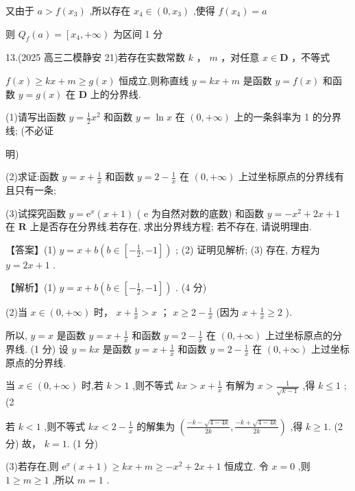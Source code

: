 \documentclass[10pt]{article}
\begin{document}
又由于 \(a > f\left( {x}_{3}\right)\) ,所以存在 \({x}_{4} \in  \left( {0,{x}_{3}}\right)\) ,使得 \(f\left( {x}_{4}\right)  = a\)

则 \({Q}_{f}\left( a\right)  = \left\lbrack  {{x}_{4}, + \infty }\right)\) 为区间 1 分

13.(2025 高三二模静安 21)若存在实数常数 \(k\) ， \(m\) ，对任意 \(x \in  \mathbf{D}\) ，不等式

\(f\left( x\right)  \geq  {kx} + m \geq  g\left( x\right)\) 恒成立,则称直线 \(y = {kx} + m\) 是函数 \(y = f\left( x\right)\) 和函数 \(y = g\left( x\right)\) 在 \(\mathbf{D}\) 上的分界线.

(1)请写出函数 \(y = \frac{1}{2}{x}^{2}\) 和函数 \(y = \ln x\) 在 \(\left( {0, + \infty }\right)\) 上的一条斜率为 1 的分界线; (不必证

明)

(2)求证:函数 \(y = x + \frac{1}{x}\) 和函数 \(y = 2 - \frac{1}{x}\) 在 \(\left( {0, + \infty }\right)\) 上过坐标原点的分界线有且只有一条;

(3)试探究函数 \(y = {\mathrm{e}}^{x}\left( {x + 1}\right)\) ( \(\mathrm{e}\) 为自然对数的底数) 和函数 \(y =  - {x}^{2} + {2x} + 1\) 在 \(\mathbf{R}\) 上是否存在分界线.若存在, 求出分界线方程; 若不存在, 请说明理由.

【答案】(1) \(y = x + b\left( {b \in  \left\lbrack  {-\frac{1}{2}, - 1}\right\rbrack  }\right)\) ; (2) 证明见解析; (3) 存在, 方程为 \(y = {2x} + 1\) .

【解析】(1) \(y = x + b\left( {b \in  \left\lbrack  {-\frac{1}{2}, - 1}\right\rbrack  }\right)\) . (4 分)

(2)当 \(x \in  \left( {0, + \infty }\right)\) 时， \(x + \frac{1}{x} > x\) ； \(x \geq  2 - \frac{1}{x}\) (因为 \(x + \frac{1}{x} \geq  2\) ).

所以, \(y = x\) 是函数 \(y = x + \frac{1}{x}\) 和函数 \(y = 2 - \frac{1}{x}\) 在 \(\left( {0, + \infty }\right)\) 上过坐标原点的分界线. (1 分) 设 \(y = {kx}\) 是函数 \(y = x + \frac{1}{x}\) 和函数 \(y = 2 - \frac{1}{x}\) 在 \(\left( {0, + \infty }\right)\) 上过坐标原点的分界线.

当 \(x \in  \left( {0, + \infty }\right)\) 时,若 \(k > 1\) ,则不等式 \({kx} > x + \frac{1}{x}\) 有解为 \(x > \frac{1}{\sqrt{k - 1}}\) ,得 \(k \leq  1\) ; (2

若 \(k < 1\) ,则不等式 \({kx} < 2 - \frac{1}{x}\) 的解集为 \(\left( {\frac{-k - \sqrt{4 - {4k}}}{2k},\frac{-k + \sqrt{4 - {4k}}}{2k}}\right)\) ,得 \(k \geq  1.\) (2 分) 故， \(k = 1.\) (1 分)

(3)若存在,则 \({\mathrm{e}}^{x}\left( {x + 1}\right)  \geq  {kx} + m \geq   - {x}^{2} + {2x} + 1\) 恒成立. 令 \(x = 0\) ,则 \(1 \geq  m \geq  1\) ,所以 \(m = 1\) .
\end{document}

